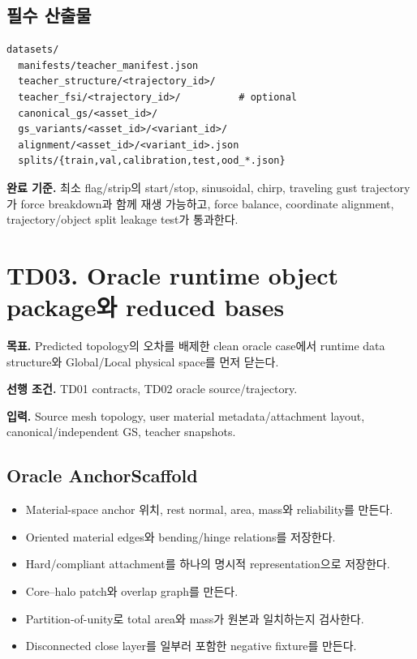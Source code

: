\documentclass[10pt,a4paper]{article}
\newcommand{\todo}{\textcolor{TodoGray}{\(\square\)}}
\begin{document}
\subsection*{필수 산출물}

\begin{lstlisting}
datasets/
  manifests/teacher_manifest.json
  teacher_structure/<trajectory_id>/
  teacher_fsi/<trajectory_id>/          # optional
  canonical_gs/<asset_id>/
  gs_variants/<asset_id>/<variant_id>/
  alignment/<asset_id>/<variant_id>.json
  splits/{train,val,calibration,test,ood_*.json}
\end{lstlisting}

\textbf{완료 기준.}
최소 flag/strip의 start/stop, sinusoidal, chirp, traveling gust trajectory가 force breakdown과 함께 재생 가능하고,
force balance, coordinate alignment, trajectory/object split leakage test가 통과한다.

\section{TD03. Oracle runtime object package와 reduced bases}

\textbf{목표.}
Predicted topology의 오차를 배제한 clean oracle case에서 runtime data structure와 Global/Local physical space를 먼저 닫는다.

\textbf{선행 조건.} TD01 contracts, TD02 oracle source/trajectory.

\textbf{입력.}
Source mesh topology, user material metadata/attachment layout, canonical/independent GS, teacher snapshots.

\subsection*{Oracle AnchorScaffold}

\begin{itemize}
  \item[\todo] Material-space anchor 위치, rest normal, area, mass와 reliability를 만든다.
  \item[\todo] Oriented material edges와 bending/hinge relations를 저장한다.
  \item[\todo] Hard/compliant attachment를 하나의 명시적 representation으로 저장한다.
  \item[\todo] Core--halo patch와 overlap graph를 만든다.
  \item[\todo] Partition-of-unity로 total area와 mass가 원본과 일치하는지 검사한다.
  \item[\todo] Disconnected close layer를 일부러 포함한 negative fixture를 만든다.
\end{itemize}
\end{document}
